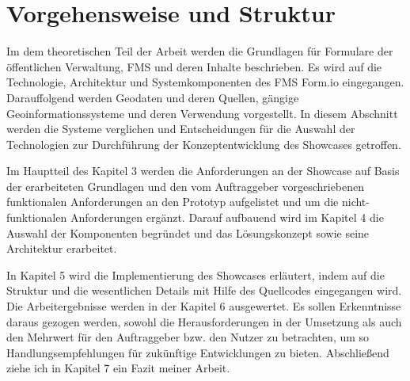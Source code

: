 \section{Vorgehensweise und Struktur}
Im dem theoretischen Teil der Arbeit werden die Grundlagen für Formulare der öffentlichen Verwaltung, FMS und deren Inhalte beschrieben. Es wird auf die Technologie, Architektur und Systemkomponenten des FMS Form.io eingegangen. Darauffolgend werden Geodaten und deren Quellen, gängige Geoinformationssysteme und deren Verwendung vorgestellt. In diesem Abschnitt werden die Systeme verglichen und Entscheidungen für die Auswahl der Technologien zur Durchführung der Konzeptentwicklung des Showcases getroffen.

Im Hauptteil des Kapitel 3 werden die Anforderungen an der Showcase auf Basis der erarbeiteten Grundlagen und den vom Auftraggeber vorgeschriebenen funktionalen Anforderungen an den Prototyp aufgelistet und um die nicht-funktionalen Anforderungen ergänzt. Darauf aufbauend wird im Kapitel 4 die Auswahl der Komponenten begründet und das Lösungskonzept sowie seine Architektur erarbeitet.

In Kapitel 5 wird die Implementierung des Showcases erläutert, indem auf die Struktur und die wesentlichen Details mit Hilfe des Quellcodes eingegangen wird. Die Arbeitergebnisse werden in der Kapitel 6 ausgewertet. Es sollen Erkenntnisse daraus gezogen werden, sowohl die Herausforderungen in der Umsetzung als auch den Mehrwert für den Auftraggeber bzw. den Nutzer zu betrachten, um so Handlungsempfehlungen für zukünftige Entwicklungen zu bieten. Abschließend ziehe ich in Kapitel 7 ein Fazit meiner Arbeit.


